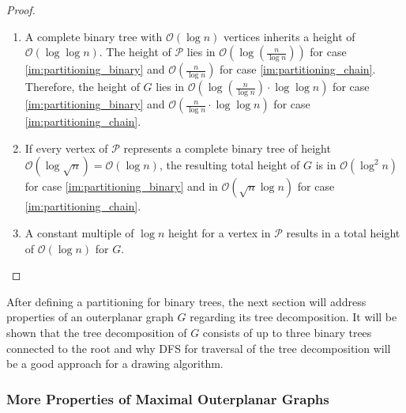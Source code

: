 \begin{proof}
\begin{enumerate}
		\item A complete binary tree with $\mathcal{O}(\log n)$ vertices inherits a height of $\mathcal{O}(\log \log n)$. The height of $\mathcal{P}$ lies in $\mathcal{O}\left(\log\left(\frac{n}{\log n}\right)\right)$ for case \ref{im:partitioning_binary} and $\mathcal{O}\left(\frac{n}{\log n}\right)$ for case \ref{im:partitioning_chain}. Therefore, the height of $G$ lies in $\mathcal{O}\left(\log\left(\frac{n}{\log n}\right)\cdot \log \log n \right)$ for case \ref{im:partitioning_binary} and $\mathcal{O}\left(\frac{n}{\log n}\cdot \log \log n\right)$ for case \ref{im:partitioning_chain}.
		\item If every vertex of $\mathcal{P}$ represents a complete binary tree of height $\mathcal{O}(\log \sqrt{n}) = \mathcal{O}(\log n)$, the resulting total height of $G$ is in $\mathcal{O}(\log^2 n)$ for case \ref{im:partitioning_binary} and in $\mathcal{O}(\sqrt{n} \log n)$ for case \ref{im:partitioning_chain}. 
		\item A constant multiple of $\log n$ height for a vertex in $\mathcal{P}$ results in a total height of $\mathcal{O}(\log n)$ for $G$.
	\end{enumerate}
\end{proof}

After defining a partitioning for binary trees, the next section will address properties of an outerplanar graph $G$ regarding its tree decomposition. It will be shown that the tree decomposition of $G$ consists of up to three binary trees connected to the root and why DFS for traversal of the tree decomposition will be a good approach for a drawing algorithm.

\subsubsection{More Properties of Maximal Outerplanar Graphs}

